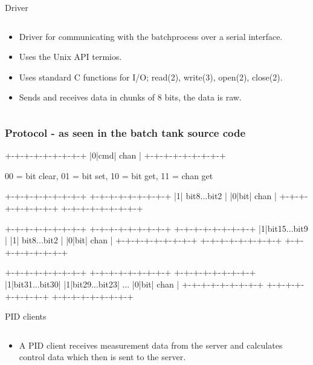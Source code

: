 \documentclass{beamer}
\begin{document}
\begin{frame}{Driver}
\begin{columns}[T]
    \begin{column}{.55\textwidth}
        \begin{itemize}
            \item Driver for communicating with the batchprocess over a serial interface.
            \item Uses the Unix API termios.
            \item Uses standard C functions for I/O; read(2), write(3), open(2), close(2).
            \item Sends and receives data in chunks of 8 bits, the data is raw.   
        \end{itemize}
    \end{column}
  \end{columns}
\end{frame}

\begin{frame}[fragile]
    \frametitle{Protocol - as seen in the batch tank source code}
        \small
\begin{semiverbatim}
+-+-+-+-+-+-+-+-+
|0|cmd|  chan   | 
+-+-+-+-+-+-+-+-+

00 = bit clear, 01 = bit set, 10 = bit get, 11 = chan get

+-+-+-+-+-+-+-+-+  +-+-+-+-+-+-+-+-+ 
|1| bit8...bit2 |  |0|bit|  chan   |
+-+-+-+-+-+-+-+-+  +-+-+-+-+-+-+-+-+ 

+-+-+-+-+-+-+-+-+  +-+-+-+-+-+-+-+-+  +-+-+-+-+-+-+-+-+ 
|1|bit15...bit9 |  |1| bit8...bit2 |  |0|bit|  chan   |
+-+-+-+-+-+-+-+-+  +-+-+-+-+-+-+-+-+  +-+-+-+-+-+-+-+-+ 
 
+-+-+-+-+-+-+-+-+  +-+-+-+-+-+-+-+-+     +-+-+-+-+-+-+-+-+ 
|1|bit31...bit30|  |1|bit29...bit23| ... |0|bit|  chan   |
+-+-+-+-+-+-+-+-+  +-+-+-+-+-+-+-+-+     +-+-+-+-+-+-+-+-+ 
\end{semiverbatim}
\end{frame}

\begin{frame}{PID clients}
\begin{columns}[T]
    \begin{column}{.55\textwidth}
        \begin{itemize}
            \item A PID client receives measurement data from the server and calculates control data which then is sent to the server.            
        \end{itemize}
    \end{column}
    \end{columns}
\end{frame}
\end{document}
